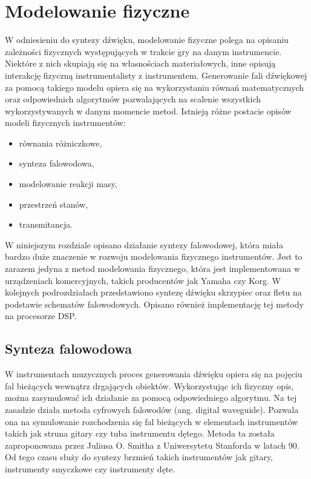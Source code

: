 \chapter{Modelowanie fizyczne}
W odniesieniu do syntezy dźwięku, modelowanie fizyczne polega na opisaniu zależności fizycznych występujących w trakcie gry na danym instrumencie. Niektóre z nich skupiają się na własnościach materiałowych, inne opisują interakcję fizyczną instrumentalisty z instrumentem. Generowanie fali dźwiękowej za pomocą takiego modelu opiera się na wykorzystaniu równań matematycznych oraz odpowiednich algorytmów pozwalających na scalenie wszystkich wykorzystywanych w danym momencie metod. Istnieją różne postacie opisów modeli fizycznych instrumentów:
\begin{itemize}
	\item równania różniczkowe,
	\item synteza falowodowa,
	\item modelowanie reakcji masy,
	\item przestrzeń stanów,
	\item transmitancja.
\end{itemize}

W niniejszym rozdziale opisano działanie syntezy falowodowej, która miała bardzo duże znaczenie w rozwoju modelowania fizycznego instrumentów. Jest to zarazem jedyna z metod modelowania fizycznego, która jest implementowana w urządzeniach komercyjnych, takich producentów jak Yamaha czy Korg. W kolejnych podrozdziałach przedstawiono syntezę dźwięku skrzypiec oraz fletu na podstawie schematów falowodowych. Opisano również implementację tej metody na procesorze DSP.


\section{Synteza falowodowa}
W instrumentach muzycznych proces generowania dźwięku opiera się na pojęciu fal bieżących wewnątrz drgających obiektów. Wykorzystując ich fizyczny opis, można zasymulować ich działanie za pomocą odpowiedniego algorytmu. Na tej zasadzie działa metoda cyfrowych falowodów (ang. digital waveguide). Pozwala ona na symulowanie  rozchodzenia się fal bieżących w elementach instrumentów takich jak struna gitary czy tuba instrumentu dętego. Metoda ta została zaproponowana przez Juliusa O. Smitha z Uniwersytetu Stanforda w latach 90. Od tego czasu służy do syntezy brzmień takich instrumentów jak gitary, instrumenty smyczkowe czy instrumenty dęte.

